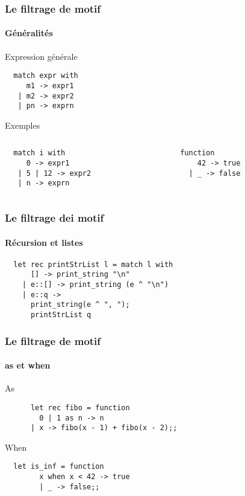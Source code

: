 \begin{frame}[fragile]
	\frametitle{Le filtrage de motif}
	\framesubtitle{Généralités}
	\begin{block}{Expression générale}
		\begin{lstlisting}
  match expr with
     m1 -> expr1
   | m2 -> expr2
   | pn -> exprn
		\end{lstlisting}
	\end{block}
	\begin{block}{Exemples}
		\begin{columns}
		\begin{column}{5cm}
		\begin{lstlisting}
  match i with
     0 -> expr1
   | 5 | 12 -> expr2
   | n -> exprn
		\end{lstlisting}
		\end{column}
		\begin{column}{5cm}
		\begin{lstlisting}
  function
      42 -> true
    | _ -> false
		\end{lstlisting} 
		\end{column}
	\end{columns}
	\end{block}
\end{frame}

\begin{frame}[fragile]
	\frametitle{Le filtrage dei motif}
	\framesubtitle{Récursion et listes}
		\begin{lstlisting}
  let rec printStrList l = match l with
      [] -> print_string "\n"
    | e::[] -> print_string (e ^ "\n")
    | e::q -> 
      print_string(e ^ ", ");
      printStrList q
		\end{lstlisting}
\end{frame}

\begin{frame}[fragile]
  	\frametitle{Le filtrage de motif}
	\framesubtitle{as et when}
  	\begin{block}{As}
    	\begin{lstlisting}
	  let rec fibo = function 
 	    0 | 1 as n -> n 
 	  | x -> fibo(x - 1) + fibo(x - 2);; 
    	\end{lstlisting}
  	\end{block}
  	\begin{block}{When}
    	\begin{lstlisting}
  let is_inf = function 
        x when x < 42 -> true
    	| _ -> false;;
    	\end{lstlisting}
  	\end{block}
\end{frame}

